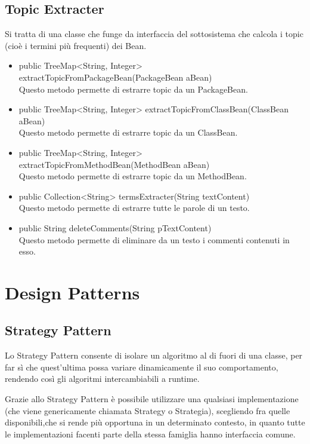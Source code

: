 \documentclass[11pt]{article}
\begin{document}
			
		
		\subsection{Topic Extracter}
		Si tratta di una classe che funge da interfaccia del sottosistema che calcola i topic (cioè i termini più frequenti) dei Bean. 
		
		\begin{itemize}
			\item public TreeMap<String, Integer> extractTopicFromPackageBean(PackageBean aBean)\\
			Questo metodo permette di estrarre topic da un PackageBean.
			\item     public TreeMap<String, Integer> extractTopicFromClassBean(ClassBean aBean)\\
			Questo metodo permette di estrarre topic da un ClassBean.
			\item     public TreeMap<String, Integer> extractTopicFromMethodBean(MethodBean aBean) \\
			Questo metodo permette di estrarre topic da un MethodBean.
			\item  public Collection<String> termsExtracter(String textContent)\\ 
			Questo metodo permette di estrarre tutte le parole di un testo.
			\item  public String deleteComments(String pTextContent)\\
			Questo metodo permette di eliminare da un testo i commenti contenuti in esso.
		\end{itemize} 
		
			
\newpage	
	\section{Design Patterns}
		\subsection{Strategy Pattern} 	
	
		Lo Strategy Pattern consente di isolare un algoritmo al di fuori di una classe, per far sì che quest’ultima possa variare dinamicamente il suo comportamento,	rendendo così gli algoritmi intercambiabili a runtime.
	
		Grazie allo Strategy Pattern è possibile utilizzare una qualsiasi implementazione (che viene genericamente chiamata Strategy o Strategia), scegliendo fra quelle disponibili,che si rende più opportuna in un determinato contesto, in quanto tutte le implementazioni	facenti parte della stessa famiglia hanno interfaccia comune.
		
\end{document}
